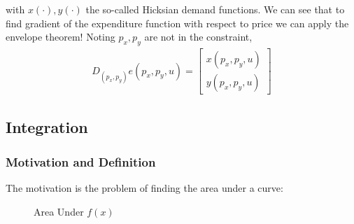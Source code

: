 \documentclass{article}
\begin{document}
with $x(\cdot), y(\cdot)$ the so-called Hicksian demand functions. We can see that to find gradient of the expenditure function with respect to price we can apply the envelope theorem! Noting $p_x, p_y$ are not in the constraint,
\begin{align*}
  D_{(p_x, p_y)} e(p_x, p_y, u)
  =
  \begin{bmatrix}
    x(p_x, p_y, u) \\ y(p_x, p_y, u)
  \end{bmatrix}
\end{align*}

\subsection{Integration}
\label{sub:integration}

\subsubsection{Motivation and Definition}
\label{ssub:motivation_and_definition}

The motivation is the problem of finding the area under a curve:
\begin{figure}[!ht]
  \centering
  \caption{Area Under $f(x)$}
  \label{fig:area_under_f_x_}
\end{figure}
\end{document}
